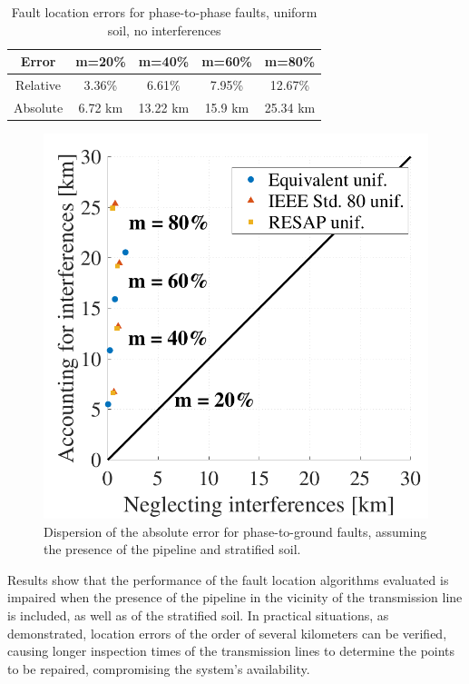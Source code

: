 \documentclass[conference]{IEEEtran}
\begin{document}
\begin{table}[!hbt]
	\renewcommand{\arraystretch}{1.3}
	\caption{Fault location errors for phase-to-phase faults, uniform soil, no interferences}
	\label{table:Err_StratInt}
	\centering
	\begin{tabular}{|c|c|c|c|c|}
		\hline
		\textbf{Error} & \textbf{m=20\%} & \textbf{m=40\%} & \textbf{m=60\%} & \textbf{m=80\%}\\
		\hline
		Relative & 3.36\% & 6.61\%  & 7.95\%  & 12.67\%\\
		\hline
		Absolute & 6.72 km & 13.22 km & 15.9 km & 25.34 km\\
		\hline
	\end{tabular}
\end{table}


\begin{figure}[hbt]
	\begin{center}
		\includegraphics[width=.7\columnwidth]{./fig/dispersao.pdf}
		\caption{Dispersion of the absolute error for phase-to-ground faults, assuming the presence of the pipeline and stratified soil.}
		\label{fig:ErrDispersion}
	\end{center}
\end{figure}

Results show that the performance of the fault location algorithms evaluated is impaired when the presence of the pipeline in the vicinity of the transmission line is included, as well as of the stratified soil. In practical situations, as demonstrated, location errors of the order of several kilometers can be verified, causing longer inspection times of the transmission lines to determine the points to be repaired, compromising the system's availability.
\end{document}
